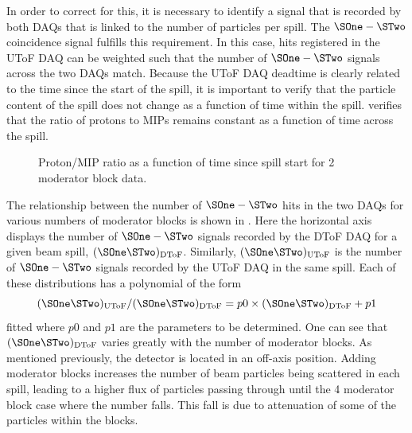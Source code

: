 In order to correct for this, it is necessary to identify a signal that is recorded by both DAQs that is linked to the number of particles per spill.
The $\SOne-\STwo$ coincidence signal fulfills this requirement.
In this case, hits registered in the UToF DAQ can be weighted such that the number of $\SOne-\STwo$ signals across the two DAQs match.
Because the UToF DAQ deadtime is clearly related to the time since the start of the spill, it is important to verify that the particle content of the spill does not change as a function of time within the spill.
 verifies that the ratio of protons to MIPs remains constant as a function of time across the spill.

\begin{figure}[h]
  \begin{adjustbox}{max totalsize=.75\textwidth, center}
    
  \end{adjustbox}
  \caption[Proton/MIP ratio as a function of time since spill start]{Proton/MIP ratio as a function of time since spill start for 2 moderator block data.}
  \label{fig:proMipRatio}
\end{figure}

The relationship between the number of $\SOne-\STwo$ hits in the two DAQs for various numbers of moderator blocks is shown in .
Here the horizontal axis displays the number of $\SOne-\STwo$ signals recorded by the DToF DAQ for a given beam spill, $(\SOne\STwo)_{\text{DToF}}$.
Similarly, $(\SOne\STwo)_{\text{UToF}}$ is the number of $\SOne-\STwo$ signals recorded by the UToF DAQ in the same spill.
Each of these distributions has a polynomial of the form
\begin{equation}
  (\SOne\STwo)_{\text{UToF}}/(\SOne\STwo)_{\text{DToF}} = p0 \times (\SOne\STwo)_{\text{DToF}} + p1
\end{equation}
fitted where $p0$ and $p1$ are the parameters to be determined.
One can see that $(\SOne \STwo)_{\text{DToF}}$ varies greatly with the number of moderator blocks. 
As mentioned previously, the \STwo detector is located in an off-axis position.
Adding moderator blocks increases the number of beam particles being scattered in each spill, leading to a higher flux of particles passing through \STwo until the 4 moderator block case where the number falls.
This fall is due to attenuation of some of the particles within the blocks.

